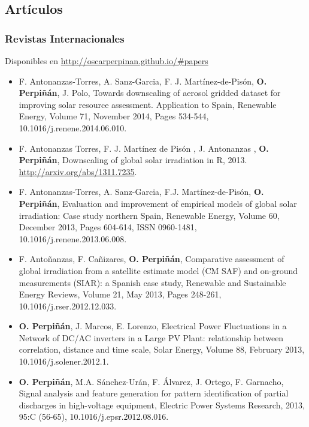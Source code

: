 \documentclass[article, a4paper]{memoir}
\begin{document}
\subsection{Artículos}
\label{sec-5-2}
\subsubsection{Revistas Internacionales}
\label{sec-5-2-1}
Disponibles en \url{http://oscarperpinan.github.io/#papers}

\begin{itemize}
\item F. Antonanzas-Torres, A. Sanz-Garcia, F. J. Martínez-de-Pisón,
\textbf{O. Perpiñán}, J. Polo, Towards downscaling of aerosol gridded
dataset for improving solar resource assessment. Application to
Spain, Renewable Energy, Volume 71, November 2014, Pages 534-544,
10.1016/j.renene.2014.06.010.

\item F. Antonanzas Torres, F. J. Martínez de Pisón , J. Antonanzas ,
\textbf{O. Perpiñán}, Downscaling of global solar irradiation in R, 2013.
\url{http://arxiv.org/abs/1311.7235}.

\item F. Antonanzas-Torres, A. Sanz-Garcia, F.J. Martínez-de-Pisón,
\textbf{O. Perpiñán}, Evaluation and improvement of empirical models of
global solar irradiation: Case study northern Spain, Renewable
Energy, Volume 60, December 2013, Pages 604-614, ISSN 0960-1481,
10.1016/j.renene.2013.06.008.

\item F. Antoñanzas, F. Cañizares, \textbf{O. Perpiñán}, Comparative assessment of
global irradiation from a satellite estimate model (CM SAF) and
on-ground measurements (SIAR): a Spanish case study, Renewable and
Sustainable Energy Reviews, Volume 21, May 2013, Pages 248-261,
10.1016/j.rser.2012.12.033.

\item \textbf{O. Perpiñán}, J. Marcos, E. Lorenzo, Electrical Power Fluctuations in
a Network of DC/AC inverters in a Large PV Plant: relationship
between correlation, distance and time scale, Solar Energy, Volume
88, February 2013, 10.1016/j.solener.2012.1.

\item \textbf{O. Perpiñán}, M.A. Sánchez-Urán, F. Álvarez, J. Ortego, F. Garnacho,
Signal analysis and feature generation for pattern identification of
partial discharges in high-voltage equipment, Electric Power Systems
Research, 2013, 95:C (56-65), 10.1016/j.epsr.2012.08.016.


\end{itemize}
\end{document}

